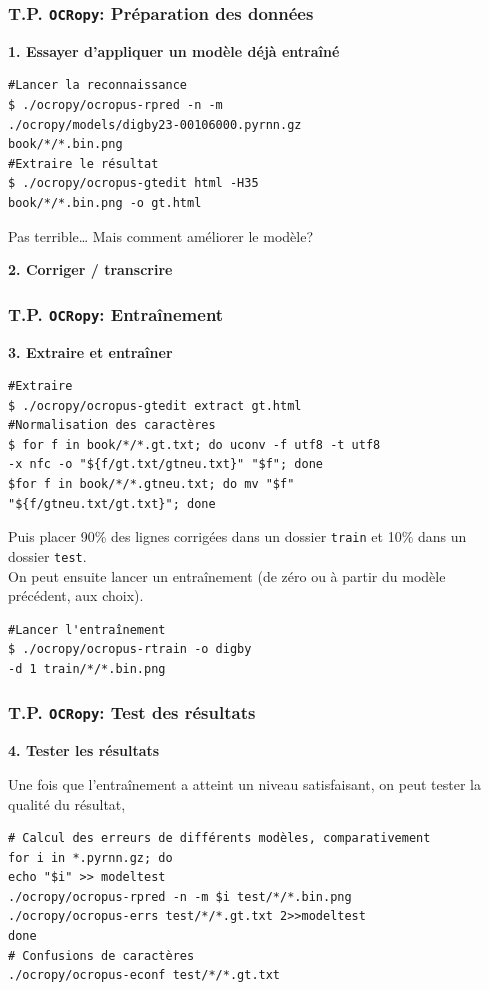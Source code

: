 \documentclass[ignorenonframetext]{beamer}
\begin{document}
\begin{frame}[fragile]
\frametitle{T.P. \texttt{OCRopy}: Préparation des données}

\textbf{1. Essayer d'appliquer un modèle déjà entraîné}
\begin{verbatim}
#Lancer la reconnaissance
$ ./ocropy/ocropus-rpred -n -m 
./ocropy/models/digby23-00106000.pyrnn.gz 
book/*/*.bin.png
#Extraire le résultat
$ ./ocropy/ocropus-gtedit html -H35 
book/*/*.bin.png -o gt.html
\end{verbatim}

Pas terrible… Mais comment améliorer le modèle?

\textbf{2. Corriger / transcrire}
\end{frame}

\begin{frame}[fragile]
\frametitle{T.P. \texttt{OCRopy}: Entraînement}


\textbf{3. Extraire et entraîner}
\begin{verbatim}
#Extraire
$ ./ocropy/ocropus-gtedit extract gt.html
#Normalisation des caractères
$ for f in book/*/*.gt.txt; do uconv -f utf8 -t utf8 
-x nfc -o "${f/gt.txt/gtneu.txt}" "$f"; done
$for f in book/*/*.gtneu.txt; do mv "$f" 
"${f/gtneu.txt/gt.txt}"; done
\end{verbatim}
Puis placer 90\% des lignes corrigées dans un dossier \texttt{train} et 10\% dans un dossier \texttt{test}.\\
On peut ensuite lancer un entraînement (de zéro ou à partir du modèle précédent, aux choix). 
\begin{verbatim}
#Lancer l'entraînement
$ ./ocropy/ocropus-rtrain -o digby 
-d 1 train/*/*.bin.png
\end{verbatim}

\end{frame}

\begin{frame}[fragile]
\frametitle{T.P. \texttt{OCRopy}: Test des résultats}


\textbf{4. Tester les résultats}

Une fois que l'entraînement a atteint un niveau satisfaisant, on peut tester la qualité du résultat, 

\begin{verbatim}
# Calcul des erreurs de différents modèles, comparativement
for i in *.pyrnn.gz; do 
echo "$i" >> modeltest 
./ocropy/ocropus-rpred -n -m $i test/*/*.bin.png
./ocropy/ocropus-errs test/*/*.gt.txt 2>>modeltest 
done
# Confusions de caractères
./ocropy/ocropus-econf test/*/*.gt.txt
\end{verbatim}

\end{frame}
\end{document}
